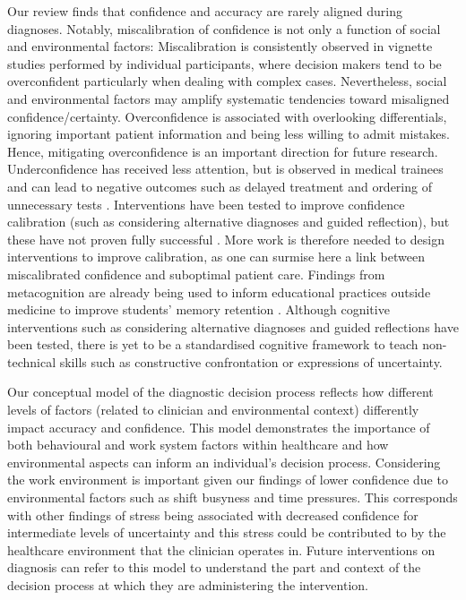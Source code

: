 \documentclass[a4paper, nobind]{templates/ociamthesis}
\begin{document}
\hfill\break
Our review finds that confidence and accuracy are rarely aligned during diagnoses. Notably, miscalibration of confidence is not only a function of social and environmental factors: Miscalibration is consistently observed in vignette studies performed by individual participants, where decision makers tend to be overconfident particularly when dealing with complex cases. Nevertheless, social and environmental factors may amplify systematic tendencies toward misaligned confidence/certainty. Overconfidence is associated with overlooking differentials, ignoring important patient information and being less willing to admit mistakes. Hence, mitigating overconfidence is an important direction for future research. Underconfidence has received less attention, but is observed in medical trainees \autocite{mann_relationship_1993,yang_effect_2012,brezis_does_2019} and can lead to negative outcomes such as delayed treatment \autocite{thompson_nurses_2004} and ordering of unnecessary tests \autocite{gupta_associations_2023}. Interventions have been tested to improve confidence calibration (such as considering alternative diagnoses and guided reflection), but these have not proven fully successful \autocite{lambe_guided_2018,costa_filho_effects_2019}. More work is therefore needed to design interventions to improve calibration, as one can surmise here a link between miscalibrated confidence and suboptimal patient care. Findings from metacognition are already being used to inform educational practices outside medicine to improve students' memory retention \autocite{dunlosky_strengthening_2013,putnam_optimizing_2016}. Although cognitive interventions such as considering alternative diagnoses and guided reflections have been tested, there is yet to be a standardised cognitive framework to teach non-technical skills such as constructive confrontation or expressions of uncertainty.

\hfill\break
Our conceptual model of the diagnostic decision process reflects how different levels of factors (related to clinician and environmental context) differently impact accuracy and confidence. This model demonstrates the importance of both behavioural and work system factors within healthcare and how environmental aspects can inform an individual's decision process. Considering the work environment is important given our findings of lower confidence due to environmental factors such as shift busyness and time pressures. This corresponds with other findings of stress being associated with decreased confidence for intermediate levels of uncertainty \autocite{heereman_stress_2011} and this stress could be contributed to by the healthcare environment that the clinician operates in. Future interventions on diagnosis can refer to this model to understand the part and context of the decision process at which they are administering the intervention.
\end{document}
